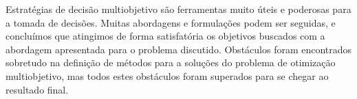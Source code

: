 Estratégias de decisão multiobjetivo são ferramentas muito úteis e poderosas para a tomada de decisões. Muitas abordagens e formulações podem ser seguidas, e concluímos que atingimos de forma satisfatória os objetivos buscados com a abordagem apresentada para o problema discutido. Obstáculos foram encontrados sobretudo na definição de métodos para a soluções do problema de otimização multiobjetivo, mas todos estes obstáculos foram superados para se chegar ao resultado final.